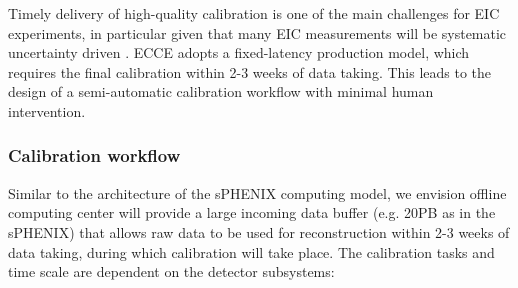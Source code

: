 


Timely delivery of high-quality calibration is one of the main challenges for EIC experiments, in particular given that many EIC measurements will be systematic uncertainty driven \cite{eic_yellow_report_v1_1}. ECCE adopts a fixed-latency production model, which requires the final calibration within 2-3 weeks of data taking. This leads to the design of a semi-automatic calibration workflow with minimal human intervention. 

\subsubsection{Calibration workflow}


Similar to the architecture of the sPHENIX computing model, we envision offline computing center will provide a large incoming data buffer (e.g. 20PB as in the sPHENIX) that allows raw data to be used for reconstruction within 2-3 weeks of data taking, during which calibration will take place. The calibration tasks and time scale are dependent on the detector subsystems: 

